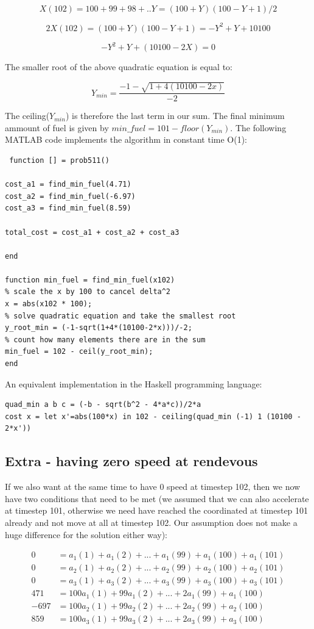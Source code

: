 \documentclass[11pt,a4paper,oneside]{report}
\begin{document}
$$X(102) = 100 + 99 + 98 + .. Y = (100+Y)(100-Y+1)/2$$

$$2X(102) = (100+Y)(100-Y+1) = -Y^2 + Y + 10100$$

$$-Y^2 + Y + (10100 - 2X) = 0$$

The smaller root of the above quadratic equation is equal to:

$$Y_{min} = \frac{-1-\sqrt{1+4(10100-2x)}}{-2}$$

The ceiling($Y_{min}$) is therefore the last term in our sum. The final minimum ammount of fuel is given by $min\_fuel = 101 - floor(Y_{min})$. The following MATLAB code implements the algorithm in constant time O(1):

\begin{lstlisting}
 function [] = prob511()

cost_a1 = find_min_fuel(4.71)
cost_a2 = find_min_fuel(-6.97)
cost_a3 = find_min_fuel(8.59)

total_cost = cost_a1 + cost_a2 + cost_a3

end

function min_fuel = find_min_fuel(x102)
% scale the x by 100 to cancel delta^2
x = abs(x102 * 100);
% solve quadratic equation and take the smallest root
y_root_min = (-1-sqrt(1+4*(10100-2*x)))/-2;
% count how many elements there are in the sum
min_fuel = 102 - ceil(y_root_min);
end
\end{lstlisting}

An equivalent implementation in the Haskell programming language:

\begin{lstlisting}
quad_min a b c = (-b - sqrt(b^2 - 4*a*c))/2*a
cost x = let x'=abs(100*x) in 102 - ceiling(quad_min (-1) 1 (10100 - 2*x'))
\end{lstlisting}


\subsection*{Extra - having zero speed at rendevous}

If we also want at the same time to have 0 speed at timestep 102, then we now have two conditions that need to be met (we assumed that we can also accelerate at timestep 101, otherwise we need have reached the coordinated at timestep 101 already and not move at all at timestep 102. Our assumption does not make a huge difference for the solution either way):

\begin{align*}
0 &= a_1(1)+a_1(2)+...+a_1(99)+a_1(100)+a_1(101)\\
0 &= a_2(1)+a_2(2)+...+a_2(99)+a_2(100)+a_2(101)\\
0 &= a_3(1)+a_3(2)+...+a_3(99)+a_3(100)+a_3(101)\\
471 &= 100a_1(1)+99a_1(2)+...+2a_1(99)+a_1(100)\\
-697 &= 100a_2(1)+99a_2(2)+...+2a_2(99)+a_2(100)\\
859 &= 100a_3(1)+99a_3(2)+...+2a_3(99)+a_3(100)\\
\end{align*}
\end{document}
